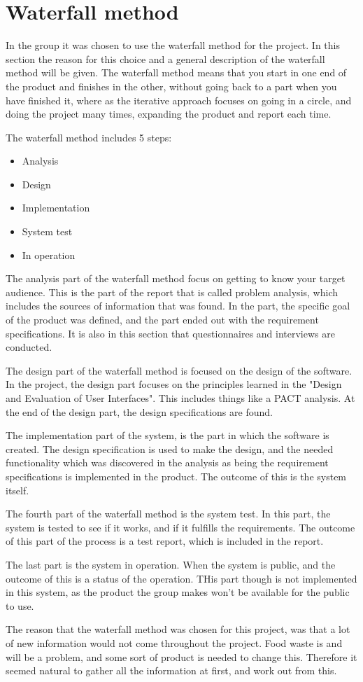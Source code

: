 \section{Waterfall method}

In the group it was chosen to use the waterfall method for the project. In this section the reason for this choice and a general description of the waterfall method will be given. The waterfall method means that you start in one end of the product and finishes in the other, without going back to a part when you have finished it, where as the iterative approach focuses on going in a circle, and doing the project many times, expanding the product and report each time.

The waterfall method includes 5 steps:

\begin{itemize}
	\item Analysis
	\item Design
	\item Implementation
	\item System test
	\item In operation
\end{itemize}

The analysis part of the waterfall method focus on getting to know your target audience. This is the part of the report that is called problem analysis, which includes the sources of information that was found. In the part, the specific goal of the product was defined, and the part ended out with the requirement specifications. It is also in this section that questionnaires and interviews are conducted.

The design part of the waterfall method is focused on the design of the software. In the project, the design part focuses on the principles learned in the "Design and Evaluation of User Interfaces". This includes things like a PACT analysis. At the end of the design part, the design specifications are found.

The implementation part of the system, is the part in which the software is created. The design specification is used to make the design, and the needed functionality which was discovered in the analysis as being the requirement specifications is implemented in the product. The outcome of this is the system itself.

The fourth part of the waterfall method is the system test. In this part, the system is tested to see if it works, and if it fulfills the requirements. The outcome of this part of the process is a test report, which is included in the report.

The last part is the system in operation. When the system is public, and the outcome of this is a status of the operation. THis part though is not implemented in this system, as the product the group makes won't be available for the public to use.

The reason that the waterfall method was chosen for this project, was that a lot of new information would not come throughout the project. Food waste is and will be a problem, and some sort of product is needed to change this. Therefore it seemed natural to gather all the information at first, and work out from this.